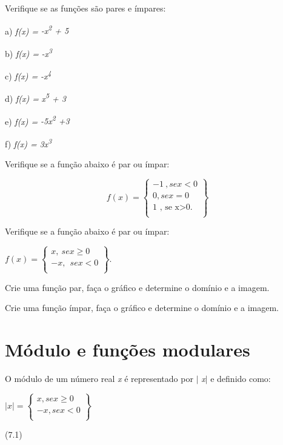\begin{exercicios}

	\exitem{} Verifique se as funções são pares e ímpares:

\begin{multicols}{3}
	a) \textit{f(x) =} \textit{-x\textsuperscript{2} + 5}

	b) \textit{f(x) =} \textit{-x\textsuperscript{3}} 
	
	c) \textit{f(x) =} \textit{-x\textsuperscript{4}}

	d) \textit{f(x) =} \textit{x\textsuperscript{5} + 3}
	
	e) \textit{f(x) =} \textit{-5x\textsuperscript{2} +3}

	f) \textit{f(x) =} \textit{3x\textsuperscript{3}}
\end{multicols}

	\exitem{} Verifique se a função abaixo é par ou ímpar:

 	\[ f \left( x \right) = \left\{ \begin{matrix}
	-1~ , se x<0\\
	0, se x=0\\
	\text{1 , se x>0.}\\
	\end{matrix}\right\}
	\] 

	\exitem{}  Verifique se a função abaixo é par ou ímpar:

	\( f \left( x \right) = \left\{ \begin{matrix}
	x,~ se x  \geq 0\\
	-x,~~se  x<0\\
	\end{matrix}\right\}
	\).

	\exitem{} Crie uma função par, faça o gráfico e determine o domínio e a imagem.

	\exitem{} Crie uma função ímpar, faça o gráfico e determine o domínio e a imagem.

\end{exercicios}
\newpage
\section{Módulo e funções modulares}

\begin{caixa}
\begin{tdefinicao}

O módulo de um número real  \textit{x} é representado por $ \vert $ \textit{x}$ \vert $  e definido como:

\(  \vert x \vert = \left\{ \begin{matrix}
x, se x  \geq 0\\
-x, se x<0\\
\end{matrix}\right\}
  \)\begin{flushright}(7.1)\end{flushright}
\end{tdefinicao}
\end{caixa}

